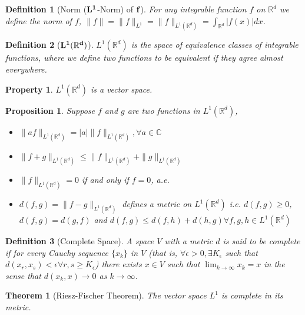\documentclass{report}
\theoremstyle{upthm}
\newtheorem{thm}{Theorem}
\newtheorem{defn}{Definition}
\newtheorem{prop}{Proposition}
\newtheorem{property}{Property}
\newcommand{\reals}{\mathbb{R}}
\newcommand{\mb}[1]{{\mathbb{#1}}}
\newcommand{\set}[1]{\big\lbrace #1 \big\rbrace}
\begin{document}
\begin{defn}[Norm ($\bf L^1$-Norm) of $\bf f$]
	For any integrable function $f$ on $\reals^d$ we define the norm of $f$, $\| f \| = \| f \|_{L^1} = \| f \|_{L^1(\reals^d)} = \int_{\reals^d} |f(x)| dx$.
\end{defn}

\begin{defn}[$\bf L^1(\reals^d)$]
	$L^1(\reals^d)$ is the space of equivalence classes of integrable functions, where we define two functions to be equivalent if they agree almost everywhere.
\end{defn}
\begin{property}
	$L^1(\reals^d)$ is a vector space.
\end{property}

\begin{prop}
	Suppose $f$ and $g$ are two functions in $L^1(\reals^d)$,
	\begin{itemize}
		\item $\| a f \|_{L^1(\reals^d)} = |a| \| f \|_{L^1(\reals^d)}, \forall a \in \mb{C} $
		\item $\| f + g \|_{L^1(\reals^d)} \leq \|  f \|_{L^1(\reals^d)} + \|  g \|_{L^1(\reals^d)} $
		\item $\| f \|_{L^1(\reals^d)} = 0 $ if and only if $f = 0$, a.e.
		\item $d(f, g) = \| f - g \|_{L^1(\reals^d)}$ defines a metric on $L^1(\reals^d)$ i.e. $d(f, g) \geq 0$, $d(f, g) = d(g, f)$ and $d(f, g) \leq d(f, h) + d(h, g) \forall f, g, h \in L^1(\reals^d)$
	\end{itemize}
\end{prop}

\begin{defn}[Complete Space]
	A space $V$ with a metric $d$ is said to be complete if for every Cauchy
	sequence $\set{x_k}$ in $V$ (that is, $\forall \epsilon > 0, \exists K_\epsilon$ such that $d(x_r, x_s) < \epsilon \forall r, s \geq K_\epsilon$) there exists $x \in V$ such that $\lim_{k \rightarrow \infty} x_k = x$ in the sense that $d(x_k, x) \rightarrow 0$ as $k \rightarrow \infty$.
\end{defn}

\begin{thm}[Riesz-Fischer Theorem]
	The vector space $L^1$ is complete in its metric.
\end{thm}
\end{document}
